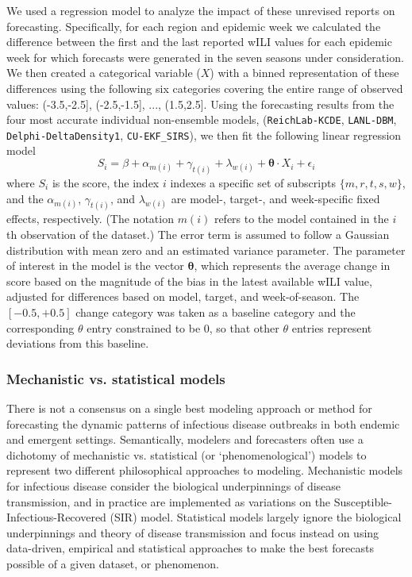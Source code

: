 \documentclass{article}\usepackage[]{graphicx}\usepackage[]{color}
\begin{document}
We used a regression model to analyze the impact of these unrevised reports on forecasting.
Specifically, for each region and epidemic week we calculated the difference between the first and the last reported wILI values for each epidemic week for which forecasts were generated in the seven seasons under consideration.
We then created a categorical variable ($X$) with a binned representation of these differences using the following six categories covering the entire range of observed values: (-3.5,-2.5], (-2.5,-1.5], ..., (1.5,2.5].
Using the forecasting results from the four most accurate individual non-ensemble models, ({\tt ReichLab-KCDE}, {\tt LANL-DBM}, {\tt Delphi-DeltaDensity1}, {\tt CU-EKF\_SIRS}), we then fit the following linear regression model
\begin{equation}
S_i = \beta + \alpha_{m(i)} + \gamma_{t(i)} + \lambda_{w(i)} + {\mathbf \theta}\cdot X_i + \epsilon_i
\end{equation}
where $S_i$ is the score, the index $i$ indexes a specific set of subscripts $\{m,r,t,s,w\}$, and the $\alpha_{m(i)}$, $\gamma_{t(i)}$, and $\lambda_{w(i)}$ are model-, target-, and week-specific fixed effects, respectively. (The notation $m(i)$ refers to the model contained in the $i$th observation of the dataset.) The error term is assumed to follow a Gaussian distribution with mean zero and an estimated variance parameter. 
The parameter of interest in the model is the vector ${\mathbf \theta}$, which represents the average change in score based on the magnitude of the bias in the latest available wILI value, adjusted for differences based on model, target, and week-of-season.  The $[-0.5,+0.5]$ change category was taken as a baseline category and the corresponding $\theta$ entry constrained to be 0, so that other $\theta$ entries represent deviations from this baseline.

\subsubsection*{Mechanistic vs. statistical models}

There is not a consensus on a single best modeling approach or method for forecasting the dynamic patterns of infectious disease outbreaks in both endemic and emergent settings. 
Semantically, modelers and forecasters often use a dichotomy of mechanistic vs. statistical (or `phenomenological') models to represent two different philosophical approaches to modeling.
Mechanistic models for infectious disease consider the biological underpinnings of disease transmission, and in practice are implemented as variations on the Susceptible-Infectious-Recovered (SIR) model. 
Statistical models largely ignore the biological underpinnings and theory of disease transmission and focus instead on using data-driven, empirical and statistical approaches to make the best forecasts possible of a given dataset, or phenomenon. 
\end{document}
